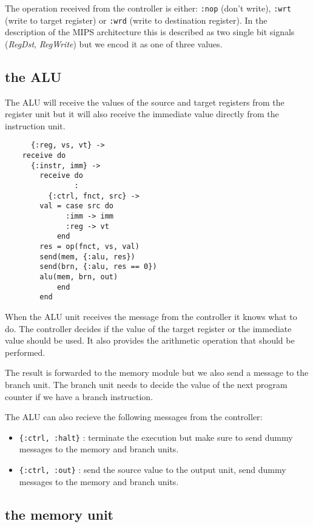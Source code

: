 \documentclass[a4paper,11pt]{article}
\begin{document}
 The operation received from the controller is either: {\tt :nop} (don't
write), {\tt :wrt} (write to target register) or {\tt :wrd} (write to
destination register). In the description of the MIPS architecture
this is described as two single bit signals ({\em RegDst}, {\em
  RegWrite}) but we encod it as one of three values. 

\subsection{the ALU}

The ALU will receive the values of the source and target registers
from the register unit but it will also receive the immediate value
directly from the instruction unit.

\begin{verbatim}
      {:reg, vs, vt} ->
	receive do
	  {:instr, imm} ->
	    receive do
                :
	      {:ctrl, fnct, src} ->
		val = case src do
		      :imm -> imm
		      :reg -> vt
		    end
		res = op(fnct, vs, val)
		send(mem, {:alu, res})
		send(brn, {:alu, res == 0})
		alu(mem, brn, out)
            end
        end
\end{verbatim}

When the ALU unit receives the message from the controller it knows
what to do. The controller decides if the value of the target register
or the immediate value should be used. It also provides the arithmetic
operation that should be performed.

The result is forwarded to the memory module but we also send a
message to the branch unit. The branch unit needs to decide the value
of the next program counter if we have a branch instruction.

The ALU can also recieve the following messages from the controller:

\begin{itemize}
\item {\tt \{:ctrl, :halt\}} : terminate the execution but make sure
  to send dummy messages to the memory and branch units.

\item {\tt \{:ctrl, :out\}} : send the source value to the output
  unit, send dummy messages to the memory and branch units.
\end{itemize}

\subsection{the memory unit}
\end{document}
